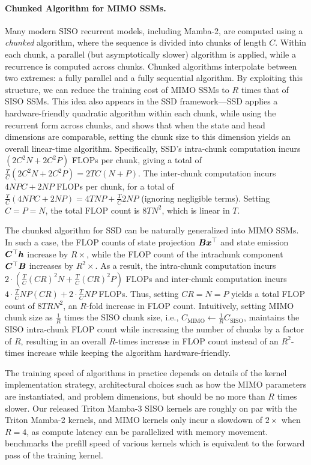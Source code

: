 \paragraph{Chunked Algorithm for MIMO SSMs.}
Many modern SISO recurrent models, including Mamba-2, are computed using a \emph{chunked} algorithm, where the sequence is divided into chunks of length $C$. Within each chunk, a parallel (but asymptotically slower) algorithm is applied, while a recurrence is computed across chunks.
Chunked algorithms interpolate between two extremes: a fully parallel and a fully sequential algorithm. By exploiting this structure, we can reduce the training cost of MIMO SSMs to $R$ times that of SISO SSMs.
This idea also appears in the SSD framework---SSD applies a hardware-friendly quadratic algorithm within each chunk, while using the recurrent form across chunks, and shows that when the state and head dimensions are comparable, setting the chunk size to this dimension yields an overall linear-time algorithm.
Specifically, SSD's intra-chunk computation incurs $\left(2C^2 N + 2C^2 P\right)$ FLOPs per chunk, giving a total of $\frac{T}{C}\left(2C^2 N + 2C^2 P \right) = 2TC(N+P)$. The inter-chunk computation incurs $4NPC + 2NP$ FLOPs per chunk, for a total of $\frac{T}{C}(4NPC + 2NP) = 4TNP + \frac{T}{C}2NP$ (ignoring negligible terms). Setting $C=P=N$, the total FLOP count is $8TN^2$, which is linear in $T$.

The chunked algorithm for SSD can be naturally generalized into MIMO SSMs.
In such a case, the FLOP counts of state projection ${\bm{B}} {\bm{x}}^\top$ and state emission ${\bm{C}}^\top {\bm{h}}$ increase by $R\times$, while the FLOP count of the intrachunk component ${\bm{C}}^\top{\bm{B}}$ increases by $R^2\times$. As a result, the intra-chunk computation incurs  $2 \cdot \left(\frac{T}{C} (CR)^2 N + \frac{T}{C} (CR)^2 P\right)$ FLOPs and inter-chunk computation incurs $4\cdot\frac{T}{C}NP(CR) + 2\cdot\frac{T}{C}NP$ FLOPs.
Thus, setting $CR=N=P$ yields a total FLOP count of $8TRN^2$, an $R$-fold increase in FLOP count. Intuitively, setting MIMO chunk size as $\frac{1}{R}$ times the SISO chunk size, i.e., $C_{\text{MIMO}} \gets \frac{1}{R}C_{\text{SISO}}$, maintains the SISO intra-chunk FLOP count while increasing the number of chunks by a factor of $R$, resulting in an overall $R$-times increase in FLOP count instead of an $R^2$-times increase while keeping the algorithm hardware-friendly.

The training speed of algorithms in practice depends on details of the kernel implementation strategy, architectural choices such as how the MIMO parameters are instantiated, and problem dimensions, but should be no more than $R$ times slower.
Our released Triton Mamba-3 SISO kernels are roughly on par with the Triton Mamba-2 kernels, and MIMO kernels only incur a slowdown of $2 {\scriptstyle\times}$ when $R=4$, as compute latency can be parallelized with memory movement.  benchmarks the prefill speed of various kernels which is equivalent to the forward pass of the training kernel.

